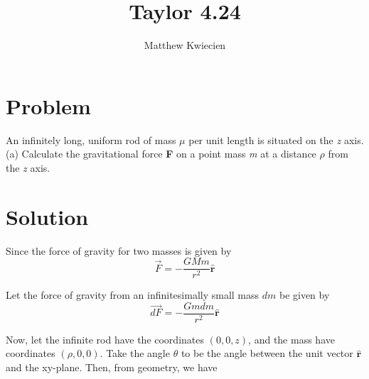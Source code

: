 \documentclass{article}
\title{Taylor 4.24}
\author{Matthew Kwiecien}
\newcommand{\uvec}[1]{\boldsymbol{\hat{\textbf{#1}}}}
\begin{document}
\maketitle

\section{Problem}
An infinitely long, uniform rod of mass $\mu$ per unit length is situated on the \textit{z} axis. (a) Calculate the gravitational force \textbf{F} on a point mass \textit{m} at a distance $\rho$ from the \textit{z} axis.


\section{Solution}
Since the force of gravity for two masses is given by
$$
\vec{F} = -\frac{GMm}{r^2}\uvec{r}
$$

\noindent Let the force of gravity from an infinitesimally small mass $dm$ be given by 
$$
\vec{dF} = -\frac{Gmdm}{r^2}\uvec{r}
$$

\noindent Now, let the infinite rod have the coordinates $(0,0,z)$, and the mass have coordinates $(\rho, 0, 0)$. Take the angle $\theta$ to be the angle between the unit vector $\uvec{r}$ and the xy-plane.  Then, from geometry, we have
\end{document}

